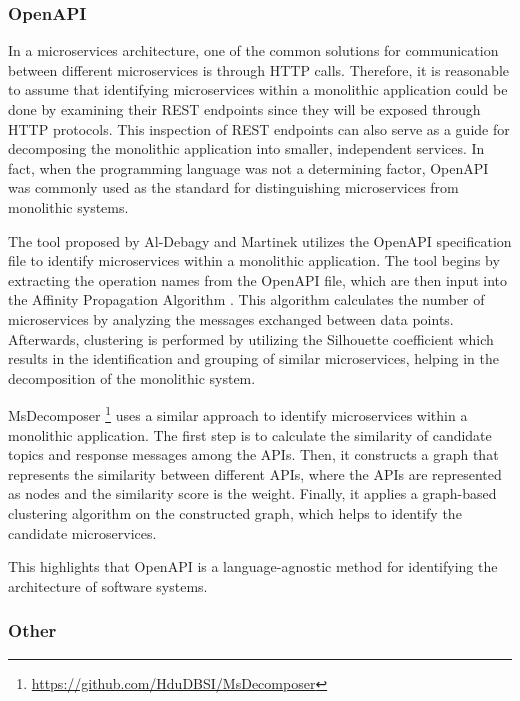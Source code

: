 \documentclass[conference]{IEEEtran}
\begin{document}
\subsubsection*{OpenAPI}

In a microservices architecture, one of the common solutions for communication
between different microservices is through HTTP calls. Therefore, it is
reasonable to assume that identifying microservices within a monolithic
application could be done by examining their REST endpoints since they will be
exposed through HTTP protocols. This inspection of REST endpoints can also
serve as a guide for decomposing the monolithic application into smaller,
independent services. In fact, when the programming language was not a
determining factor, OpenAPI was commonly used as the standard for
distinguishing microservices from monolithic systems.

The tool proposed by Al-Debagy and Martinek  utilizes the
OpenAPI specification file to identify microservices within a monolithic
application. The tool begins by extracting the operation names from the OpenAPI
file, which are then input into the Affinity Propagation Algorithm
\cite{frey2007clustering}. This algorithm calculates the number of
microservices by analyzing the messages exchanged between data points.
Afterwards, clustering is performed by utilizing the Silhouette coefficient
\cite{rousseeuw1987silhouettes} which results in the identification and
grouping of similar microservices, helping in the decomposition of the
monolithic system.

MsDecomposer \footnote{\url{https://github.com/HduDBSI/MsDecomposer}}
 uses a similar approach to identify microservices
within a monolithic application. The first step is to calculate the similarity
of candidate topics and response messages among the APIs. Then, it constructs a
graph that represents the similarity between different APIs, where the APIs are
represented as nodes and the similarity score is the weight. Finally, it
applies a graph-based clustering algorithm on the constructed graph, which
helps to identify the candidate microservices.

This highlights that OpenAPI is a language-agnostic method for identifying the
architecture of software systems.

\subsubsection*{Other}
\end{document}
